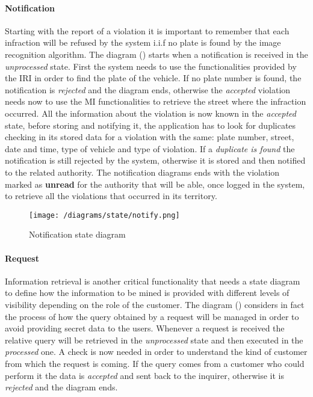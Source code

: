 		\paragraph{Notification}
			Starting with the report of a violation it is important to remember that each infraction will be refused by the system i.i.f no plate is found by the image recognition algorithm. The diagram () starts when a notification is received in the \textit{unprocessed} state. First the system needs to use the functionalities provided by the IRI in order to find the plate of the vehicle. If no plate number is found, the notification is \textit{rejected} and the diagram ends, otherwise the \textit{accepted} violation needs now to use the MI functionalities to retrieve the street where the infraction occurred. All the information about the violation is now known in the \textit{accepted} state, before storing and notifying it, the application has to look for duplicates checking in its stored data for a violation with the same: plate number, street, date and time, type of vehicle and type of violation. If a \textit{duplicate is found} the notification is still rejected by the system, otherwise it is stored and then notified to the related authority. The notification diagrams ends with the violation marked as \textbf{unread} for the authority that will be able, once logged in the system, to retrieve all the violations that occurred in its territory.
			
			\vspace{0.3cm}
			\begin{figure}[h]
				\centering
				\texttt{[image: /diagrams/state/notify.png]}
				\caption{\label{fig:notifyState}Notification state diagram}
			\end{figure}
		
		\paragraph{Request}
			Information retrieval is another critical functionality that needs a state diagram to define how the information to be mined is provided with different levels of visibility depending on the role of the customer. The diagram () considers in fact the process of how the query obtained by a request will be managed in order to avoid providing secret data to the users. Whenever a request is received the relative query will be retrieved in the \textit{unprocessed} state and then executed in the \textit{processed} one. A check is now needed in order to understand the kind of customer from which the request is coming. If the query comes from a customer who could perform it the data is \textit{accepted} and sent back to the inquirer, otherwise it is \textit{rejected} and the diagram ends.
			
